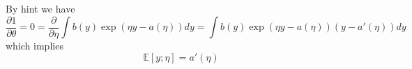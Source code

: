 \begin{answer}
By hint we have
\[ \frac{\partial 1}{\partial \theta}=0=\frac{\partial}{\partial \eta}\int b(y)\exp(\eta y-a(\eta)) dy =\int b(y)\exp(\eta y-a(\eta))(y-a'(\eta)) dy \]
which implies
\[ \mathbb{E}[y;\eta] = a'(\eta)\]
\end{answer} 
